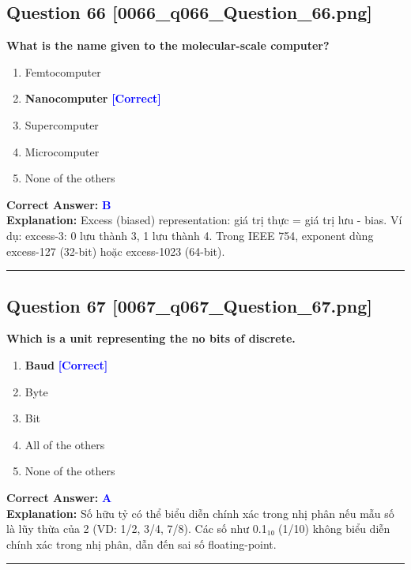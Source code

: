 \documentclass[11pt,a4paper]{article}
\begin{document}
\begin{minipage}{\textwidth}
\subsection*{Question 66 \quad \footnotesize{[0066\_q066\_Question\_66.png]}}
\noindent \textbf{What is the name given to the molecular-scale computer?}

\begin{enumerate}[label=\Alph*.]
    \item Femtocomputer
    \item \textbf{Nanocomputer} \hfill \textcolor{blue}{\textbf{[Correct]}}
    \item Supercomputer
    \item Microcomputer
    \item None of the others
\end{enumerate}

\noindent \textbf{Correct Answer:} \textcolor{blue}{\textbf{B}} \\[2pt]
\noindent \textbf{Explanation:} Excess (biased) representation: giá trị thực = giá trị lưu - bias. Ví dụ: excess-3: 0 lưu thành 3, 1 lưu thành 4. Trong IEEE 754, exponent dùng excess-127 (32-bit) hoặc excess-1023 (64-bit).

\par\vspace{0.3cm}
\hrule
\vspace{0.3cm}
\end{minipage}

\begin{minipage}{\textwidth}
\subsection*{Question 67 \quad \footnotesize{[0067\_q067\_Question\_67.png]}}
\noindent \textbf{Which is a unit representing the no bits of discrete.}

\begin{enumerate}[label=\Alph*.]
    \item \textbf{Baud} \hfill \textcolor{blue}{\textbf{[Correct]}}
    \item Byte
    \item Bit
    \item All of the others
    \item None of the others
\end{enumerate}

\noindent \textbf{Correct Answer:} \textcolor{blue}{\textbf{A}} \\[2pt]
\noindent \textbf{Explanation:} Số hữu tỷ có thể biểu diễn chính xác trong nhị phân nếu mẫu số là lũy thừa của 2 (VD: 1/2, 3/4, 7/8). Các số như 0.1₁₀ (1/10) không biểu diễn chính xác trong nhị phân, dẫn đến sai số floating-point.

\par\vspace{0.3cm}
\hrule
\vspace{0.3cm}
\end{minipage}
\end{document}

